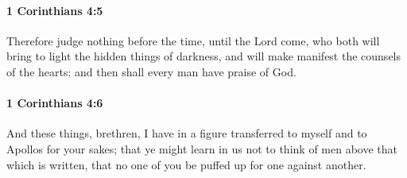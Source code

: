 		\paragraph{1 Corinthians 4:5} %
			\label{1CORINTHIANS-4-5}

			Therefore judge nothing before the time, until the Lord come, who both will bring to light the hidden things of darkness, and will make manifest the counsels of the hearts: and then shall every man have praise of God.

			\begin{framed}
			\scriptsize
				\begin{compactdesc}
					\item[SBLG] 
				\end{compactdesc}
			\end{framed}

		\paragraph{1 Corinthians 4:6} %
			\label{1CORINTHIANS-4-6}

			And these things, brethren, I have in a figure transferred to myself and to Apollos for your sakes; that ye might learn in us not to think of men above that which is written, that no one of you be puffed up for one against another.

